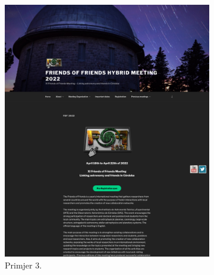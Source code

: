 		\begin{figure}[H]
			\centering
			\begin{subfigure}{0.4\linewidth}
				\addtocounter{subfigure}{2}
				\includegraphics[width=\linewidth]{slike/frontpage_example3}
				\caption{Primjer 3.}
				\label{frontpage_example3}
			\end{subfigure}
			\begin{subfigure}{0.4\linewidth}

\end{subfigure}
\end{figure}
